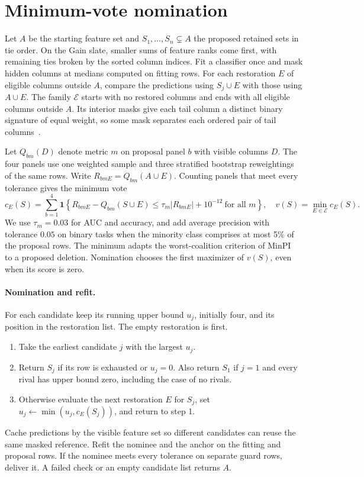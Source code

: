 \section{Minimum-vote nomination}
\label{sec:minimum-vote}
Let \(A\) be the starting feature set and \(S_1,\ldots,S_n\subsetneq A\) the proposed retained sets in tie order. On the Gain slate, smaller sums of feature ranks come first, with remaining ties broken by the sorted column indices.
Fit a classifier once and mask hidden columns at medians computed on fitting rows.
For each restoration \(E\) of eligible columns outside \(A\), compare the predictions using \(S_j\cup E\) with those using \(A\cup E\).
The family \(\mathcal E\) starts with no restored columns and ends with all eligible columns outside \(A\). Its interior masks give each tail column a distinct binary signature of equal weight, so some mask separates each ordered pair of tail columns~\cite{spencer1970separating}.

Let \(Q_{bm}(D)\) denote metric \(m\) on proposal panel \(b\) with visible columns \(D\). The four panels use one weighted sample and three stratified bootstrap reweightings of the same rows. Write \(R_{bmE}=Q_{bm}(A\cup E)\). Counting panels that meet every tolerance gives the minimum vote
\[
 c_E(S)=\sum_{b=1}^{4}\mathbf 1\!\left\{
   R_{bmE}-Q_{bm}(S\cup E)\leq \tau_m |R_{bmE}|+10^{-12}
   \ \text{for all }m\right\},\quad
 v(S)=\min_{E\in\mathcal E}c_E(S).
\]
We use \(\tau_m=0.03\) for AUC and accuracy, and add average precision with tolerance \(0.05\) on binary tasks when the minority class comprises at most 5\% of the proposal rows. The minimum adapts the worst-coalition criterion of MinPI~\cite{shi2026minpi} to a proposed deletion. Nomination chooses the first maximizer of \(v(S)\), even when its score is zero.

\paragraph{Nomination and refit.}
For each candidate keep its running upper bound \(u_j\), initially four, and its position in the restoration list. The empty restoration is first.
\begin{enumerate}\setlength{\itemsep}{0pt}
\item Take the earliest candidate \(j\) with the largest \(u_j\).
\item Return \(S_j\) if its row is exhausted or \(u_j=0\). Also return \(S_1\) if \(j=1\) and every rival has upper bound zero, including the case of no rivals.
\item Otherwise evaluate the next restoration \(E\) for \(S_j\), set \(u_j\gets\min(u_j,c_E(S_j))\), and return to step 1.
\end{enumerate}
Cache predictions by the visible feature set so different candidates can reuse the same masked reference. Refit the nominee and the anchor on the fitting and proposal rows. If the nominee meets every tolerance on separate guard rows, deliver it. A failed check or an empty candidate list returns \(A\).
